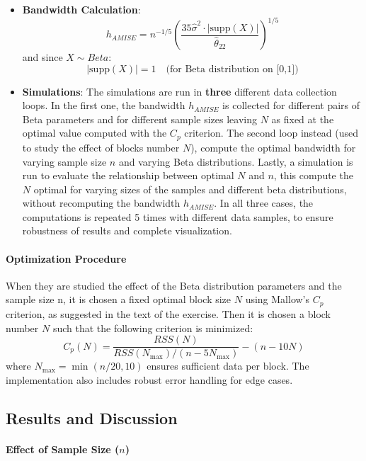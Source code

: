 \documentclass{article}
\begin{document}
\begin{itemize}
    \item \textbf{Bandwidth Calculation}:
    \[
    h_{AMISE} = n^{-1/5} \left( \frac{35 \hat{\sigma}^2 \cdot |\text{supp}(X)|}{\hat{\theta}_{22}} \right)^{1/5}
    \]
    and since $X \sim Beta$:
    $$
    |\text{supp}(X)| = 1 \quad \text{(for Beta distribution on [0,1])}$$

    \item \textbf{Simulations}: 
    The simulations are run in \textbf{three} different data collection loops. In the first one, the bandwidth $h_{AMISE}$
    is collected for different pairs of Beta parameters and for different sample sizes leaving $N$ as fixed at the optimal value computed with the $C_p$ criterion.
    The second loop instead (used to study the effect of blocks number $N$), compute the optimal bandwidth for varying sample size $n$ and varying Beta distributions. 
    Lastly, a simulation is run to evaluate the relationship between optimal $N$ and $n$, this compute the $N$ optimal for varying sizes of the samples and different beta distributions, without recomputing the bandwidth $h_{AMISE}$.
    In all three cases, the computations is repeated 5 times with different data samples, to ensure robustness of results and complete visualization.
\end{itemize}

\paragraph{Optimization Procedure}
When they are studied the effect of the Beta distribution parameters and the sample size n, it is chosen a fixed optimal block size $N$ using Mallow's $C_p$ criterion, as suggested in the text of the exercise.
Then it is chosen a block number $N$ such that the following criterion is minimized:
\[
C_p(N) = \frac{RSS(N)}{RSS(N_{\max})/(n-5N_{\max})} - (n - 10N)
\]
where $N_{\max} = \min(n/20, 10)$ ensures sufficient data per block. The implementation also includes robust error handling for edge cases.

\subsection{Results and Discussion}

\paragraph{Effect of Sample Size ($n$)}
\end{document}
